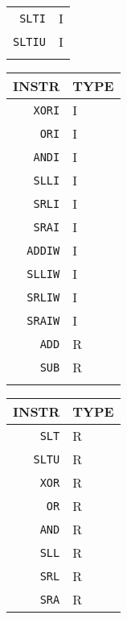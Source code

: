 \begin{table}
\begin{minipage}{.25\linewidth}
\begin{tabular}{r|l}
            \texttt{SLTI}  & I    \\
            \texttt{SLTIU} & I    \\ \\
        \end{tabular}
    \end{minipage}%
    \begin{minipage}{.25\linewidth}
        \centering
        \begin{tabular}{r|l}
            \hline
            INSTR          & TYPE \\
            \hline
            \texttt{XORI}  & I    \\
            \texttt{ORI}   & I    \\
            \texttt{ANDI}  & I    \\
            \texttt{SLLI}  & I    \\
            \texttt{SRLI}  & I    \\
            \texttt{SRAI}  & I    \\
            \hline
            \texttt{ADDIW} & I    \\
            \texttt{SLLIW} & I    \\
            \texttt{SRLIW} & I    \\
            \texttt{SRAIW} & I    \\
            \hline
            \texttt{ADD}   & R    \\
            \texttt{SUB}   & R    \\ \\
        \end{tabular}
    \end{minipage}%
    \begin{minipage}{0.25\linewidth}
        \centering
        \begin{tabular}{r|l}
            \hline
            INSTR         & TYPE \\
            \hline
            \texttt{SLT}  & R    \\
            \texttt{SLTU} & R    \\
            \texttt{XOR}  & R    \\
            \texttt{OR}   & R    \\
            \texttt{AND}  & R    \\
            \texttt{SLL}  & R    \\
            \texttt{SRL}  & R    \\
            \texttt{SRA}  & R    \\

\end{tabular}
\end{minipage}
\end{table}
